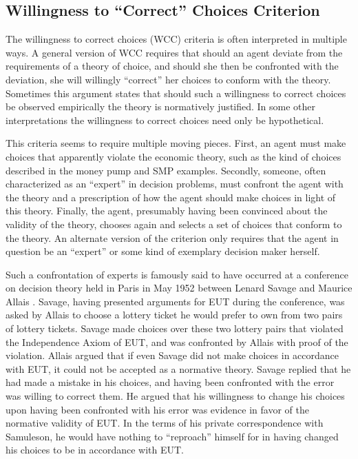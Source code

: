 \documentclass[../main.tex]{subfiles}
\begin{document}
\subsection{Willingness to \enquote{Correct} Choices Criterion}

The willingness to correct choices (WCC) criteria is often interpreted in multiple ways.
A general version of WCC requires that should an agent deviate from the requirements of a theory of choice, and should she then be confronted with the deviation, she will willingly \enquote{correct} her choices to conform with the theory.
Sometimes this argument states that should such a willingness to correct choices be observed empirically the theory is normatively justified.
In some other interpretations the willingness to correct choices need only be hypothetical.

This criteria seems to require multiple moving pieces.
First, an agent must make choices that apparently violate the economic theory, such as the kind of choices described in the money pump and SMP examples.
Secondly, someone, often characterized as an \enquote{expert} in decision problems, must confront the agent with the theory and a prescription of how the agent should make choices in light of this theory.
Finally, the agent, presumably having been convinced about the validity of the theory, chooses again and selects a set of choices that conform to the theory.
An alternate version of the criterion only requires that the agent in question be an \enquote{expert} or some kind of exemplary decision maker herself.

Such a confrontation of experts is famously said to have occurred at a conference on decision theory held in Paris in May 1952 between Lenard Savage and Maurice Allais \parencites[1]{Allais1953}[221]{Moscati2016}.
Savage, having presented arguments for EUT during the conference, was asked by Allais to choose a lottery ticket he would prefer to own from two pairs of lottery tickets.
Savage made choices over these two lottery pairs that violated the Independence Axiom of EUT, and was confronted by Allais with proof of the violation.
Allais argued that if even Savage did not make choices in accordance with EUT, it could not be accepted as a normative theory.
Savage replied that he had made a mistake in his choices, and having been confronted with the error was willing to correct them.
He argued that his willingness to change his choices upon having been confronted with his error was evidence in favor of the normative validity of EUT.
In the terms of his private correspondence with Samuleson, he would have nothing to \enquote{reproach} himself for in having changed his choices to be in accordance with EUT. \parencite[230]{Moscati2016}
\end{document}
